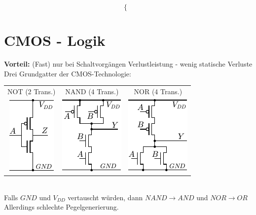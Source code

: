 \documentclass[6pt,a4paper]{scrartcl}
\renewcommand{\emph}[1]{\textsf{\textbf{#1}}}
\newcommand{\ra}[0]{\ensuremath{\rightarrow}} 									%
\begin{document}
\begin{multicols*}{3}
\begin{equation*}
\begin{cases}
	\end{cases}
	\end{equation*}

\section{CMOS - Logik}
	\emph{Vorteil:}	 (Fast) nur bei Schaltvorgängen Verlustleistung - wenig statische Verluste \\
Drei Grundgatter der CMOS-Technologie:\\
	\begin{tabular}{ccc}
		NOT (2 Trans.) & NAND (4 Trans.) & NOR (4 Trans.)\\
		\includegraphics{./img/ds/mosfet_not.pdf} \qquad & \includegraphics{./img/ds/mosfet_nand.pdf} \qquad & \includegraphics{./img/ds/mosfet_nor.pdf} \\
	\end{tabular}\\
	Falls $GND$ und $V_{DD}$ vertauscht würden, dann $NAND \ra AND$ und $NOR \ra OR$\\
	Allerdings schlechte Pegelgenerierung.
	

\end{multicols*}
\end{document}
